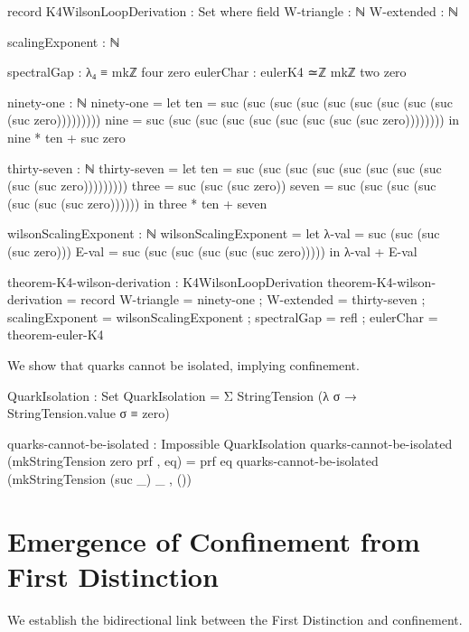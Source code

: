 \documentclass[11pt,a4paper]{book}
\begin{document}
\begin{code}
record K4WilsonLoopDerivation : Set where
  field
    W-triangle : ℕ
    W-extended : ℕ
    
    scalingExponent : ℕ
    
    spectralGap  : λ₄ ≡ mkℤ four zero
    eulerChar    : eulerK4 ≃ℤ mkℤ two zero

ninety-one : ℕ
ninety-one = 
  let ten = suc (suc (suc (suc (suc (suc (suc (suc (suc (suc zero)))))))))
      nine = suc (suc (suc (suc (suc (suc (suc (suc (suc zero))))))))
  in nine * ten + suc zero

thirty-seven : ℕ
thirty-seven = 
  let ten = suc (suc (suc (suc (suc (suc (suc (suc (suc (suc zero)))))))))
      three = suc (suc (suc zero))
      seven = suc (suc (suc (suc (suc (suc (suc zero))))))
  in three * ten + seven

wilsonScalingExponent : ℕ
wilsonScalingExponent = 
  let λ-val = suc (suc (suc (suc zero)))
      E-val = suc (suc (suc (suc (suc (suc zero)))))
  in λ-val + E-val

theorem-K4-wilson-derivation : K4WilsonLoopDerivation
theorem-K4-wilson-derivation = record
  { W-triangle = ninety-one
  ; W-extended = thirty-seven
  ; scalingExponent = wilsonScalingExponent
  ; spectralGap  = refl
  ; eulerChar    = theorem-euler-K4
  }
\end{code}

We show that quarks cannot be isolated, implying confinement.

\begin{code}
QuarkIsolation : Set
QuarkIsolation = Σ StringTension (λ σ → StringTension.value σ ≡ zero)

quarks-cannot-be-isolated : Impossible QuarkIsolation
quarks-cannot-be-isolated (mkStringTension zero prf , eq) = prf eq
quarks-cannot-be-isolated (mkStringTension (suc _) _ , ())
\end{code}

\section{Emergence of Confinement from First Distinction}

We establish the bidirectional link between the First Distinction and confinement.
\end{document}
